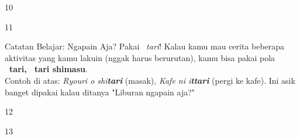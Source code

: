 \begin{convobox}{10}
    \noindent
      
      

    \vspace{1.5em}
\end{convobox}

\begin{convobox}{11}
    \noindent
      

    \vspace{1.5em}
\end{convobox}

\begin{lessonbox}{Catatan Belajar: Ngapain Aja? Pakai \textit{~tari}!}
    Kalau kamu mau cerita beberapa aktivitas yang kamu lakuin (nggak harus berurutan), kamu bisa pakai pola \textbf{~tari, ~tari shimasu}. \\
    
    Contoh di atas: \textit{Ryouri o shi\textbf{tari}} (masak), \textit{Kafe ni i\textbf{ttari}} (pergi ke kafe). Ini asik banget dipakai kalau ditanya "Liburan ngapain aja?"
\end{lessonbox}

\begin{convobox}{12}
    \noindent

    \vspace{1.5em}
\end{convobox}

\begin{convobox}{13}
    \noindent

    \vspace{1.5em}
\end{convobox}

